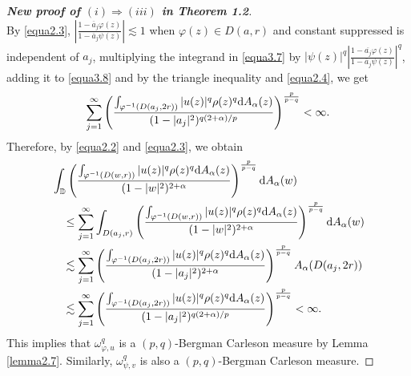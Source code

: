 \documentclass[preprint,12pt,times]{elsarticle}
\theoremstyle{definition}
\theoremstyle{remark}
\numberwithin{equation}{section}
\begin{document}
\begin{proof}[{\bf New proof of $(i)\Rightarrow (iii)$ in Theorem 1.2}]
\begin{equation}
\end{equation}
By \eqref{equa2.3}, $\left|\frac{1-\overline{a}_j\varphi(z)}{1-\overline{a}_j\psi(z)}\right|\lesssim 1$ when $\varphi(z)\in D(a,r)$ and constant suppressed is independent of $a_j$, multiplying the integrand in \eqref{equa3.7} by $|\psi(z)|^q\left|\frac{1-\overline{a_j}\varphi(z)}{1-\overline{a}_j\psi(z)}\right|^q$, adding it to \eqref{equa3.8} and by the triangle inequality and \eqref{equa2.4}, we get
\begin{equation}\label{equa3.9}
\sum_{j=1}^{\infty}\left(\frac{\int_{\varphi^{-1}(D(a_j,2r))}|u(z)|^q\rho(z)^q{\rm d}A_{\alpha}(z)}{(1-|a_j|^2)^{q(2+\alpha)/p}}\right)^{\frac{p}{p-q}}<\infty.
\end{equation}
Therefore, by \eqref{equa2.2} and \eqref{equa2.3}, we obtain
\begin{equation}\label{equa3.10}
\begin{split}
&\int_{\mathbb{D}}\left(\frac{\int_{\varphi^{-1}(D(w,r))}|u(z)|^q\rho(z)^q{\rm d}A_{\alpha}(z)}{(1-|w|^2)^{2+\alpha}}\right)^{\frac{p}{p-q}}{\rm d}A_{\alpha}(w)\\
&\quad \leq \sum_{j=1}^{\infty}\int_{D(a_j,r)}\left(\frac{\int_{\varphi^{-1}(D(w,r))}|u(z)|^q\rho(z)^q{\rm d}A_{\alpha}(z)}{(1-|w|^2)^{2+\alpha}}\right)^{\frac{p}{p-q}}{\rm d}A_{\alpha}(w)\\
&\quad \lesssim \sum_{j=1}^{\infty}\left(\frac{\int_{\varphi^{-1}(D(a_j,2r))}|u(z)|^q\rho(z)^q{\rm d}A_{\alpha}(z)}{(1-|a_j|^2)^{2+\alpha}}\right)^{\frac{p}{p-q}}A_{\alpha}(D(a_j,2r))\\
&\quad \lesssim \sum_{j=1}^{\infty}\left(\frac{\int_{\varphi^{-1}(D(a_j,2r))}|u(z)|^q\rho(z)^q{\rm d}A_{\alpha}(z)}{(1-|a_j|^2)^{q(2+\alpha)/p}}\right)^{\frac{p}{p-q}}<\infty.
\end{split}
\end{equation}
This implies that $\omega_{\varphi,u}^q$ is a $(p,q)$-Bergman Carleson measure by Lemma \ref{lemma2.7}. Similarly, $\omega_{\psi,v}^q$ is also a $(p,q)$-Bergman Carleson measure.


\end{proof}
\end{document}
